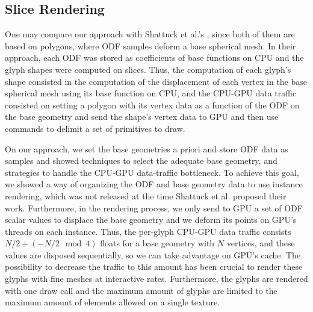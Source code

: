\documentclass[twoside,twocolumn,10pt]{article}
\begin{document}
\subsection{Slice Rendering}

One may compare our approach with Shattuck et al.'s \cite{shattuck2008}, since both of them are based on polygons, where ODF samples deform a base spherical mesh. In their approach, each ODF was stored as coefficients of base functions on CPU and the glyph shapes were computed on slices. Thus, the computation of each glyph's shape consisted in the computation of the displacement of each vertex in the base spherical mesh using its base function on CPU, and the CPU-GPU data traffic consisted on setting a polygon with its vertex data as a function of the ODF on the base geometry and send the shape's vertex data to GPU and then use commands to delimit a set of primitives to draw.

On our approach, we set the base geometries a priori and store ODF data as samples and showed techniques to select the adequate base geometry, and strategies to handle the CPU-GPU data-traffic bottleneck. To achieve this goal, we showed a way of organizing the ODF and base geometry data to use instance rendering, which was not released at the time Shattuck et al. proposed their work. Furthermore, in the rendering process, we only send to GPU a set of ODF scalar values to displace the base geometry and we deform its points on GPU's threads on each instance. Thus, the per-glyph CPU-GPU data traffic consists $N/2 + (-N/2 \mod{4})$ floats for a base geometry with $N$ vertices, and these values are disposed sequentially, so we can take advantage on GPU's cache. The possibility to decrease the traffic to this amount has been crucial to render these glyphs with fine meshes at interactive rates. Furthermore, the glyphs are rendered with one draw call and the maximum amount of glyphs are limited to the maximum amount of elements allowed on a single texture.

\end{document}
